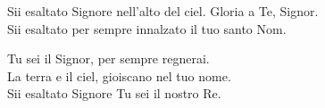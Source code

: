 
Sii esaltato Signore nell'alto del ciel. Gloria a Te, Signor.\\
Sii esaltato per sempre innalzato il tuo santo Nom.

\spazio

Tu sei il Signor, per sempre regnerai.\\
La terra e il ciel, gioiscano nel tuo nome.\\
Sii esaltato Signore Tu sei il nostro Re.